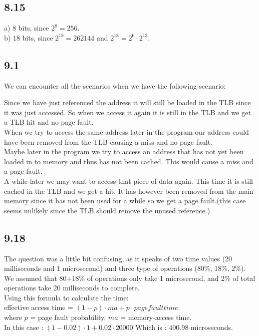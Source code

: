\documentclass[]{article}
\begin{document}
\subsection*{8.15}

a) 8 bits, since $2^8 = 256$.\\
b) 18 bits, since $2^{18} = 262144$ and $2^{18} = 2^{6} \cdot 2^{12}$.\\

\subsection*{9.1}

We can encounter all the scenarios when we have the following scenario:

Since we have just referenced the address it will still be loaded in the TLB since it was just accessed. So when we access it again it is still in the TLB and we get a TLB hit and no page fault.\\
When we try to access the same address later in the program our address could have been removed from the TLB causing a miss and no page fault.\\
Maybe later in the program we try to access an address that has not yet been loaded in to memory and thus has not been cached. This would cause a miss and a page fault.\\
A while later we may want to access that piece of data again. This time it is still cached in the TLB and we get a hit. It has however been removed from the main memory since it has not been used for a while so we get a page fault.(this case seems unlikely since the TLB should remove the unused reference.)\\

\subsection*{9.18}

The question was a little bit confusing, as it speaks of two time values (20 milliseconds and 1 microsecond) and three type of operations (80\%, 18\%, 2\%).\\

We assumed that 80+18\% of operations only take 1 microsecond, and 2\% of total operations take 20 milliseconds to complete.\\

Using this formula to calculate the time:\\
effective access time = $(1 - p) \cdot ma + p \cdot page fault time$.\\
where $p$ = page fault probability, $ma$ = memory-access time.\\

In this case : $(1 - 0.02) \cdot 1 + 0.02 \cdot 20000$
Which is : 400.98 microseconds.
\end{document}
